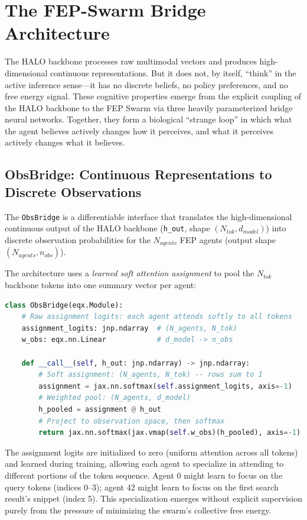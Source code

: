 \section{The FEP-Swarm Bridge Architecture}

The HALO backbone processes raw multimodal vectors and produces high-dimensional continuous representations. But it does not, by itself, ``think'' in the active inference sense---it has no discrete beliefs, no policy preferences, and no free energy signal. These cognitive properties emerge from the explicit coupling of the HALO backbone to the FEP Swarm via three heavily parameterized bridge neural networks. Together, they form a biological ``strange loop'' in which what the agent believes actively changes how it perceives, and what it perceives actively changes what it believes.

\subsection{ObsBridge: Continuous Representations to Discrete Observations}

The \texttt{ObsBridge} is a differentiable interface that translates the high-dimensional continuous output of the HALO backbone (\texttt{h\_out}, shape $(N_{tok}, d_{model})$) into discrete observation probabilities for the $N_{agents}$ FEP agents (output shape $(N_{agents}, n_{obs})$).

The architecture uses a \textit{learned soft attention assignment} to pool the $N_{tok}$ backbone tokens into one summary vector per agent:

\begin{lstlisting}[language=python]
class ObsBridge(eqx.Module):
    # Raw assignment logits: each agent attends softly to all tokens
    assignment_logits: jnp.ndarray  # (N_agents, N_tok)
    w_obs: eqx.nn.Linear            # d_model -> n_obs

    def __call__(self, h_out: jnp.ndarray) -> jnp.ndarray:
        # Soft assignment: (N_agents, N_tok) -- rows sum to 1
        assignment = jax.nn.softmax(self.assignment_logits, axis=-1)
        # Weighted pool: (N_agents, d_model)
        h_pooled = assignment @ h_out
        # Project to observation space, then softmax
        return jax.nn.softmax(jax.vmap(self.w_obs)(h_pooled), axis=-1)
\end{lstlisting}

The assignment logits are initialized to zero (uniform attention across all tokens) and learned during training, allowing each agent to specialize in attending to different portions of the token sequence. Agent 0 might learn to focus on the query tokens (indices 0--3); agent 42 might learn to focus on the first search result's snippet (index 5). This specialization emerges without explicit supervision purely from the pressure of minimizing the swarm's collective free energy.

